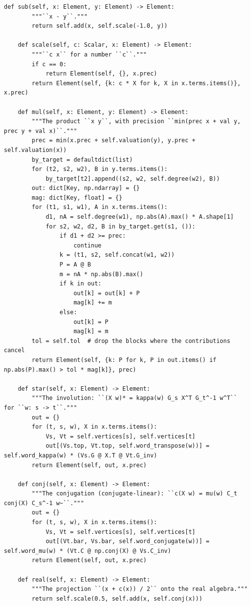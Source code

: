 \documentclass[12pt, a4paper]{report}
\theoremstyle{plain}
\theoremstyle{definition}
\theoremstyle{remark}
\theoremstyle{plain}
\begin{document}
\begin{lstlisting}[style=dsqcode]
    def sub(self, x: Element, y: Element) -> Element:
        """``x - y``."""
        return self.add(x, self.scale(-1.0, y))

    def scale(self, c: Scalar, x: Element) -> Element:
        """``c x`` for a number ``c``."""
        if c == 0:
            return Element(self, {}, x.prec)
        return Element(self, {k: c * X for k, X in x.terms.items()}, x.prec)

    def mul(self, x: Element, y: Element) -> Element:
        """The product ``x y``, with precision ``min(prec x + val y, prec y + val x)``."""
        prec = min(x.prec + self.valuation(y), y.prec + self.valuation(x))
        by_target = defaultdict(list)
        for (t2, s2, w2), B in y.terms.items():
            by_target[t2].append((s2, w2, self.degree(w2), B))
        out: dict[Key, np.ndarray] = {}
        mag: dict[Key, float] = {}
        for (t1, s1, w1), A in x.terms.items():
            d1, nA = self.degree(w1), np.abs(A).max() * A.shape[1]
            for s2, w2, d2, B in by_target.get(s1, ()):
                if d1 + d2 >= prec:
                    continue
                k = (t1, s2, self.concat(w1, w2))
                P = A @ B
                m = nA * np.abs(B).max()
                if k in out:
                    out[k] = out[k] + P
                    mag[k] += m
                else:
                    out[k] = P
                    mag[k] = m
        tol = self.tol  # drop the blocks where the contributions cancel
        return Element(self, {k: P for k, P in out.items() if np.abs(P).max() > tol * mag[k]}, prec)

    def star(self, x: Element) -> Element:
        """The involution: ``(X w)* = kappa(w) G_s X^T G_t^-1 w^T`` for ``w: s -> t``."""
        out = {}
        for (t, s, w), X in x.terms.items():
            Vs, Vt = self.vertices[s], self.vertices[t]
            out[(Vs.top, Vt.top, self.word_transpose(w))] = self.word_kappa(w) * (Vs.G @ X.T @ Vt.G_inv)
        return Element(self, out, x.prec)

    def conj(self, x: Element) -> Element:
        """The conjugation (conjugate-linear): ``c(X w) = mu(w) C_t conj(X) C_s^-1 w~``."""
        out = {}
        for (t, s, w), X in x.terms.items():
            Vs, Vt = self.vertices[s], self.vertices[t]
            out[(Vt.bar, Vs.bar, self.word_conjugate(w))] = self.word_mu(w) * (Vt.C @ np.conj(X) @ Vs.C_inv)
        return Element(self, out, x.prec)

    def real(self, x: Element) -> Element:
        """The projection ``(x + c(x)) / 2`` onto the real algebra."""
        return self.scale(0.5, self.add(x, self.conj(x)))


\end{lstlisting}
\end{document}
